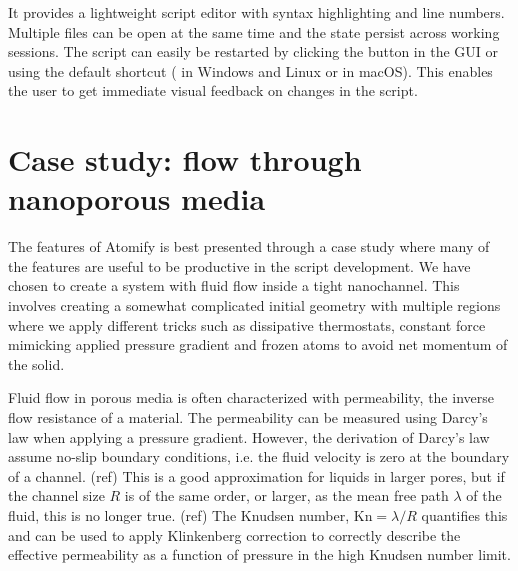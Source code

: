 \documentclass[aps,pre,twocolumn,letterpaper,floatfix,nofootinbib]{revtex4}
\begin{document}
It provides a lightweight script editor with syntax highlighting and line numbers.
Multiple files can be open at the same time and the state persist across working sessions.
The script can easily be restarted by clicking the button in the GUI or using
the default shortcut ( in Windows and Linux or  in macOS).
This enables the user to get immediate visual feedback on changes in the script.

\section{\label{sec:casestudy}Case study: flow through nanoporous media}
The features of Atomify is best presented through a case study where many of the features are useful to be productive in the script development.
We have chosen to create a system with fluid flow inside a tight nanochannel.
This involves creating a somewhat complicated initial geometry with multiple regions where we apply different tricks such as dissipative thermostats, constant force mimicking applied pressure gradient and frozen atoms to avoid net momentum of the solid.

Fluid flow in porous media is often characterized with permeability, the inverse flow resistance of a material.
The permeability can be measured using Darcy's law when applying a pressure gradient.
However, the derivation of Darcy's law assume no-slip boundary conditions, i.e. the fluid velocity is zero at the boundary of a channel. (ref)
This is a good approximation for liquids in larger pores, but if the channel size $R$ is of the same order, or larger, as the mean free path $\lambda$ of the fluid, this is no longer true. (ref)
The Knudsen number, $\text{Kn} = \lambda / R$ quantifies this and can be used to apply Klinkenberg correction\citep{klinkenberg1941permeability} to correctly describe the effective permeability as a function of pressure in the high Knudsen number limit.
\end{document}
